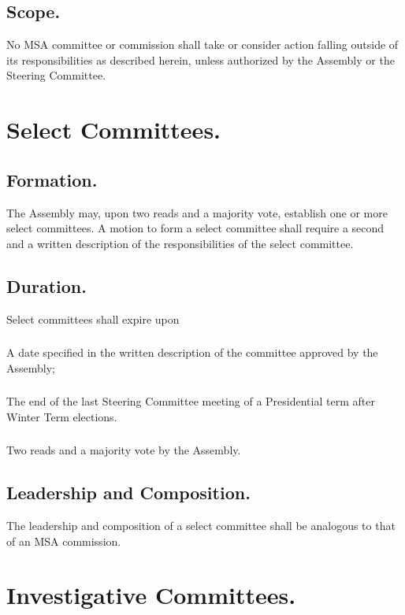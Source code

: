 \subsection{Scope.}
No MSA committee or commission shall take or consider action falling outside of its responsibilities as described herein, unless authorized by the Assembly or the Steering Committee.

\section{Select Committees.}

\subsection{Formation.}
The Assembly may, upon two reads and a majority vote, establish one or more select committees.  A motion to form a select committee shall require a second and a written description of the responsibilities of the select committee.

\subsection{Duration.}
Select committees shall expire upon
\subsubsection{}
A date specified in the written description of the committee approved by the Assembly;
\subsubsection{}
The end of the last Steering Committee meeting of a Presidential term after Winter Term elections. 
\subsubsection{}
Two reads and a majority vote by the Assembly.

\subsection{Leadership and Composition.}
The leadership and composition of a select committee shall be analogous to that of an MSA commission.  


\section{Investigative Committees.}

